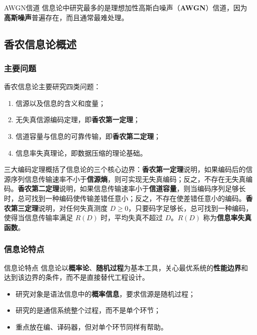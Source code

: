 \begin{keypoint}{AWGN信道}
信息论中研究最多的是理想加性高斯白噪声（\textbf{AWGN}）信道，因为\textbf{高斯噪声}普遍存在，而且通常最难处理。
\end{keypoint}

\subsection{香农信息论概述}

\subsubsection{主要问题}
香农信息论主要研究四类问题：

\begin{enumerate}
  \item 信源以及信息的含义和度量；
  \item 无失真信源编码定理，即\textbf{香农第一定理}；
  \item 信道容量与信息的可靠传输，即\textbf{香农第二定理}；
  \item 信息率失真理论，即数据压缩的理论基础。
\end{enumerate}

三大编码定理概括了信息论的三个核心边界：\textbf{香农第一定理}说明，如果编码后的信源序列信息传输速率不小于\textbf{信源熵}，则可实现无失真编码；反之，不存在无失真编码。\textbf{香农第二定理}说明，如果信息传输速率小于\textbf{信道容量}，则当编码序列足够长时，总可找到一种编码使传输差错任意小；反之，不存在使差错任意小的编码。\textbf{香农第三定理}说明，对任何失真测度 $D \ge 0$，只要码字足够长，总可找到一种编码，使得当信息传输率满足 $R(D)$ 时，平均失真不超过 $D$。$R(D)$ 称为\textbf{信息率失真函数}。

\subsubsection{信息论特点}
\begin{keypoint}{信息论特点}
信息论以\textbf{概率论}、\textbf{随机过程}为基本工具，关心最优系统的\textbf{性能边界}和达到该边界的条件，而不是直接替代工程设计。
\end{keypoint}

\begin{itemize}
  \item 研究对象是语法信息中的\textbf{概率信息}，要求信源是随机过程；
  \item 研究的是通信系统整个过程，而不是单个环节；
  \item 重点放在编、译码器，但对单个环节同样有帮助。
\end{itemize}

